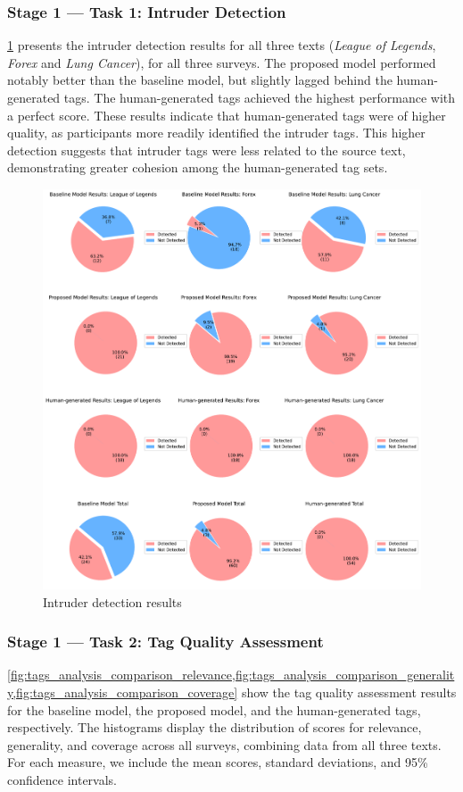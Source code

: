\subsubsection{Stage 1 — Task 1: Intruder Detection}
\cref{fig:intruder_detection_results} presents the intruder detection results for all three texts (\textit{League of Legends}, \textit{Forex} and \textit{Lung Cancer}), for all three surveys. The proposed model performed notably better than the baseline model, but slightly lagged behind the human-generated tags. The human-generated tags achieved the highest performance with a perfect score. These results indicate that human-generated tags were of higher quality, as participants more readily identified the intruder tags. This higher detection suggests that intruder tags were less related to the source text, demonstrating greater cohesion among the human-generated tag sets.

\begin{figure}[h]
    \centering
    \includegraphics[width=\textwidth]{figures/intruder_detection_results.pdf}
    \caption{Intruder detection results}
    \label{fig:intruder_detection_results}
\end{figure}

\subsubsection{Stage 1 — Task 2: Tag Quality Assessment}
\cref{fig:tags_analysis_comparison_relevance,fig:tags_analysis_comparison_generality,fig:tags_analysis_comparison_coverage} show the tag quality assessment results for the baseline model, the proposed model, and the human-generated tags, respectively. The histograms display the distribution of scores for relevance, generality, and coverage across all surveys, combining data from all three texts. For each measure, we include the mean scores, standard deviations, and 95\% confidence intervals.


